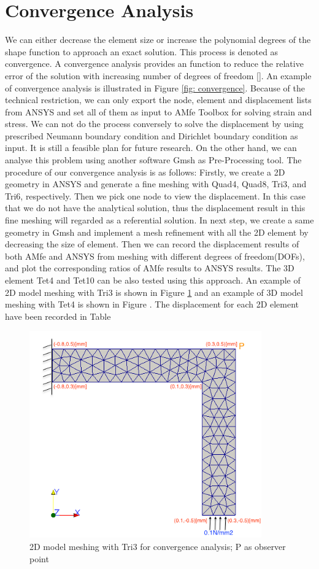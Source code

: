 \section{Convergence Analysis}
We can either decrease the element size or increase the polynomial degrees of the shape function to approach an exact solution. This process is denoted as convergence. A convergence analysis provides an function to reduce the relative error of the solution with increasing number of degrees of freedom [\cite{FiniteElement}]. An example of convergence analysis is illustrated in Figure \ref{fig: convergence}. Because of the technical restriction, we can only export the node, element and displacement lists from ANSYS and set all of them as input to AMfe Toolbox for solving strain and stress. We can not do the process conversely to solve the displacement by using prescribed Neumann boundary condition and Dirichlet boundary condition as input. It is still a feasible plan for future research. On the other hand, we can analyse this problem using another software Gmsh as Pre-Processing tool. The procedure of our convergence analysis is as follows: Firstly, we create a 2D geometry in ANSYS and generate a fine meshing with Quad4, Quad8, Tri3, and Tri6, respectively. Then we pick one node to view the displacement. In this case that we do not have the analytical solution, thus the displacement result in this fine meshing will regarded as a referential solution. In next step, we create a same geometry in Gmsh and implement a mesh refinement with all the 2D element by decreasing the size of element. Then we can record the displacement results of both AMfe and ANSYS from meshing with different degrees of freedom(DOFs), and plot the corresponding ratios of AMfe results to ANSYS results. The 3D element Tet4 and Tet10 can be also tested using this approach. An example of 2D model meshing with Tri3 is shown in Figure \ref{fig: Convergence2D} and an example of 3D model meshing with Tet4 is shown in Figure . 
The displacement for each 2D element have been recorded in Table 

\begin{figure}[htbp]
	\begin{center}	
		\includegraphics[width=10cm,clip]{Convergence2D.png} 			
		\caption{2D model meshing with Tri3 for convergence analysis; P as observer point} \label{fig: Convergence2D}
	\end{center}
\end{figure}

